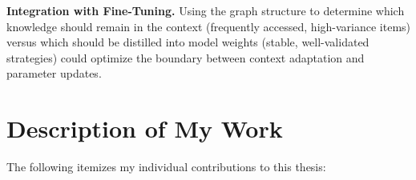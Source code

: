 \documentclass[12pt,a4paper,oneside]{article}
\begin{document}
\textbf{Integration with Fine-Tuning.} Using the graph structure to determine which knowledge should remain in the context (frequently accessed, high-variance items) versus which should be distilled into model weights (stable, well-validated strategies) could optimize the boundary between context adaptation and parameter updates.

\section*{Description of My Work}

The following itemizes my individual contributions to this thesis:
\end{document}
